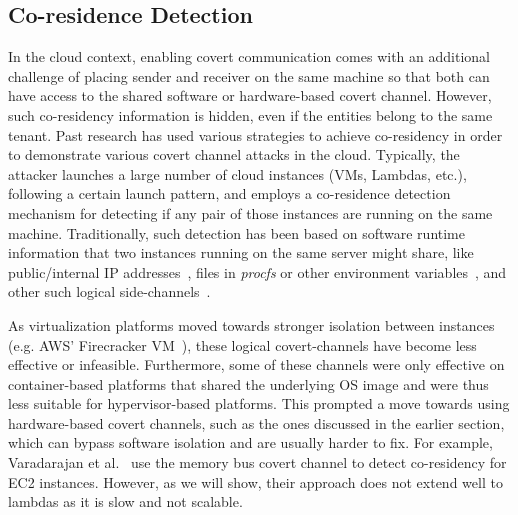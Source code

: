\subsection{Co-residence Detection}
\label{sec:background:coresidence}

In the cloud context, enabling covert communication comes with an additional 
challenge of placing sender and receiver on the same machine so that both 
can have access to the shared software or hardware-based covert channel. However,
such co-residency information is hidden, even if the entities belong to the same
tenant. Past research has used various strategies to achieve co-residency in order 
to demonstrate various covert channel attacks in the cloud. Typically, the
attacker launches a large number of cloud instances (VMs, Lambdas, etc.),
following a certain launch pattern, and employs a co-residence detection
mechanism for detecting if any pair of those instances are running on the same
machine. Traditionally, such detection has been based on software
runtime information that two instances running on the same server might share,
like public/internal IP addresses~\cite{ristenpartccs2009}, files in
\textit{procfs} or other environment variables~\cite{wangusenix2018,wuusenix2012}, 
and other such logical side-channels~\cite{varad191016,vmplacement}.

As virtualization platforms moved towards stronger isolation between instances (e.g.
AWS' Firecracker VM~\cite{firecracker}), these logical covert-channels have
become less effective or infeasible. Furthermore, some of these channels were
only effective on container-based platforms that shared the underlying OS image
and were thus less suitable for hypervisor-based platforms.  This prompted a
move towards using hardware-based covert channels, such as the ones discussed in
the earlier section, which can bypass software isolation and are usually harder
to fix. For example, Varadarajan et al.~\cite{varadarajan2015} use the memory
bus covert channel to detect co-residency for EC2 instances.  However, as we
will show, their approach does not extend well to lambdas as it is slow and 
not scalable.

